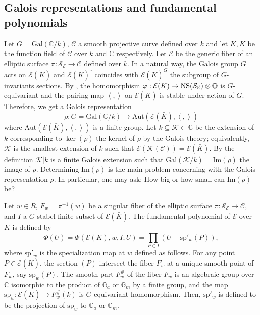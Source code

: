 \documentclass[11pt]{amsart}
\newcommand{\Kb}{{{\bar K}}}
\newcommand{\Q}{{\mathbb Q}}
\newcommand{\CC}{{\mathbb C}}
\newcommand{\Cc}{{\mathcal C}}
\newcommand{\Ee}{{\mathcal E}}
\newcommand{\KK}{{\mathcal K}}
\newcommand{\Sc}{{\mathcal S}}
\newcommand{\aut}{{\text{Aut}}}
\numberwithin{equation}{section}
\numberwithin{table}{section}
\newcommand\<{\langle}
\begin{document}
\subsection{Galois representations and fundamental polynomials}
Let $G=\text{Gal}(\CC/k)$, $\Cc$ a smooth projective curve  defined over $k$ and  let $K, \Kb$ be the function field of $\Cc$ over $k$ and $\CC$ respectively.
Let   $\Ee$ be the generic fiber of an elliptic surface $\pi: \Sc_{\Ee} \rightarrow \Cc$ defined over $k$. In a natural way, the Galois group $G$
acts on $\Ee(\Kb)$ and $\Ee(\Kb)^\circ $  coincides with $\Ee(\Kb)^G$ the subgroup of $G$-invariants sections.
By  \cite[proposition 8.13]{Shioda1992a},  the homomorphism    $\varphi: \Ee(\Kb) \rightarrow {\rm NS} (\Sc_\Ee) \otimes \Q$ is
$G$-equivariant and the pairing map $\left\langle , \right\rangle $ on $\Ee(\Kb)$ is stable under action of $G$.
Therefore, we get a Galois representation $$\rho: G =\text{Gal}(\CC/k) \rightarrow \aut\left(  \Ee(\Kb), \left\langle , \right\rangle \right)  $$
where $\aut\left(  \Ee(\Kb), \left\langle , \right\rangle \right)  $ is a finite group.
Let $k \subseteq \KK \subset \CC $ be  the extension of $k$ corresponding to  
$\ker(\rho)$  the kernel of $\rho$ by the Galois theory; 
equivalently, $\KK$ is the smallest extension of $k$ such that  $\Ee(\KK(\Cc))=\Ee(\Kb)$.
By the definition $\KK|k$ is a finite Galois extension such that $\text{Gal}(\KK/k) =\text{Im}(\rho)$ the image of $\rho.$ 
Determining  $\text{Im}(\rho)$ is
the main problem concerning  with the Galois representation $\rho$. In particular, one may ask:  How big or how small can $\text{Im}(\rho)$ be?



Let $w\in R$, $F_w=\pi^{-1}(w)$ be a singular fiber of the elliptic surface $\pi: \Sc_{\Ee} \rightarrow \Cc$, and
$I$ a $G$-stabel finite subset of $\Ee(\Kb)$. The {\sf fundamental polynomial} of $\Ee$ over $K$ is defined by
$$\Phi(U)= \Phi(\Ee(K), w, I;U)=\prod_{P\in I}^{} (U-\text{sp}'_w(P)),$$
where $\text{sp}'_w$ is the {\sf specialization map} at $w$ defined as follows.
For any point $P\in \Ee(\Kb)$, the section $(P)$ intersect the fiber $F_w$ at a unique smooth point of $F_w$, say $\text{sp}_w(P)$.
The smooth part $F_w^{\#}$ of the fiber $F_w$ is an algebraic group over $\CC$ 
isomorphic to the product of ${\mathbb G}_a$ or ${\mathbb G}_m$ by a finite group, and 
the map $\text{sp}_w:  \Ee(\Kb) \rightarrow F_w^{\#}(k)$ is $G$-equivariant homomorphism. Then, $\text{sp}'_w$ is defined to be the projection of 
$\text{sp}_w$ to  ${\mathbb G}_a$ or ${\mathbb G}_m$. 
\end{document}
